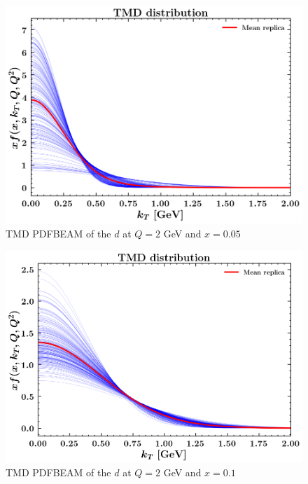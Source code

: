 \documentclass[]{article}
\begin{document}
\begin{figure}
\centering
\includegraphics{pngplots/tmd_1_2_0.05.png}
\caption{TMD PDFBEAM of the \(d\) at \(Q = 2\) GeV and \(x = 0.05\)}
\end{figure}

\begin{figure}
\centering
\includegraphics{pngplots/tmd_1_2_0.1.png}
\caption{TMD PDFBEAM of the \(d\) at \(Q = 2\) GeV and \(x = 0.1\)}
\end{figure}
\end{document}
